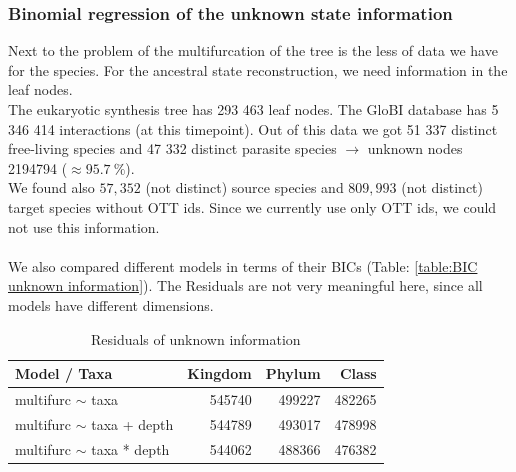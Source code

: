       \subsubsection{Binomial regression of the unknown state information}

        Next to the problem of the multifurcation of the tree is the less of data we have for the species.
          For the ancestral state reconstruction, we need information in the leaf nodes. \\
        The eukaryotic synthesis tree has 293 463 leaf nodes. The GloBI database has 5 346 414 interactions 
          (at this timepoint). Out of this data we got 51 337 distinct free-living species and 47 332 
          distinct parasite species $\rightarrow$ unknown nodes 2194794 ($\approx 95.7~\%$). \\
        We found also $57,352$ (not distinct) source species and $809,993$ (not distinct) target
          species without OTT ids. Since we currently use only OTT ids, we could not use this information. \\
         \\
        We also compared different models in terms of their BICs (Table: \ref{table:BIC unknown information}). 
          The Residuals are not very meaningful here, since all models have different dimensions.

        \begin{table}[h!]
          \begin{center}
            \begin{tabular}{ |l|r|r|r| }
              \hline
              Model / Taxa & Kingdom & Phylum & Class \\
              \hline \hline
              multifurc $\sim$ taxa & 545740 & \cellcolor{green!10}499227 & \cellcolor{green!30}482265 \\
              \hline
              multifurc $\sim$ taxa + depth & 544789 & \cellcolor{green!10}493017 & \cellcolor{green!50}478998 \\
              \hline
              multifurc $\sim$ taxa * depth & 544062 & \cellcolor{green!30}488366 & \cellcolor{green!50}476382 \\
              \hline
            \end{tabular}
          \end{center}
          \caption{Residuals of unknown information}
          \label{table:...}
        \end{table}

